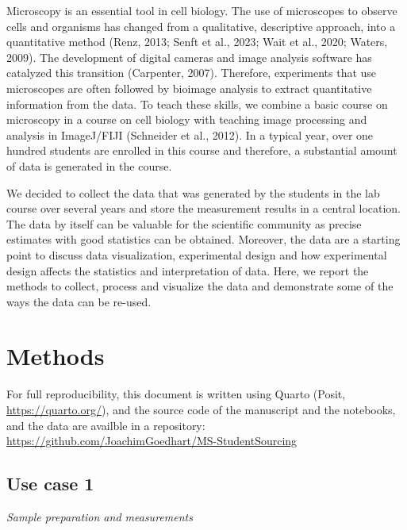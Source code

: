 \documentclass[
]{agujournal2019}
\begin{document}
Microscopy is an essential tool in cell biology. The use of microscopes
to observe cells and organisms has changed from a qualitative,
descriptive approach, into a quantitative method (Renz, 2013; Senft et
al., 2023; Wait et al., 2020; Waters, 2009). The development of digital
cameras and image analysis software has catalyzed this transition
(Carpenter, 2007). Therefore, experiments that use microscopes are often
followed by bioimage analysis to extract quantitative information from
the data. To teach these skills, we combine a basic course on microscopy
in a course on cell biology with teaching image processing and analysis
in ImageJ/FIJI (Schneider et al., 2012). In a typical year, over one
hundred students are enrolled in this course and therefore, a
substantial amount of data is generated in the course.

We decided to collect the data that was generated by the students in the
lab course over several years and store the measurement results in a
central location. The data by itself can be valuable for the scientific
community as precise estimates with good statistics can be obtained.
Moreover, the data are a starting point to discuss data visualization,
experimental design and how experimental design affects the statistics
and interpretation of data. Here, we report the methods to collect,
process and visualize the data and demonstrate some of the ways the data
can be re-used.

\hypertarget{sec-data-methods}{%
\section*{Methods}\label{sec-data-methods}}

For full reproducibility, this document is written using Quarto (Posit,
\url{https://quarto.org/}), and the source code of the manuscript and
the notebooks, and the data are availble in a repository:
\url{https://github.com/JoachimGoedhart/MS-StudentSourcing}

\hypertarget{use-case-1}{%
\subsection*{Use case 1}\label{use-case-1}}

\emph{Sample preparation and measurements}
\end{document}
